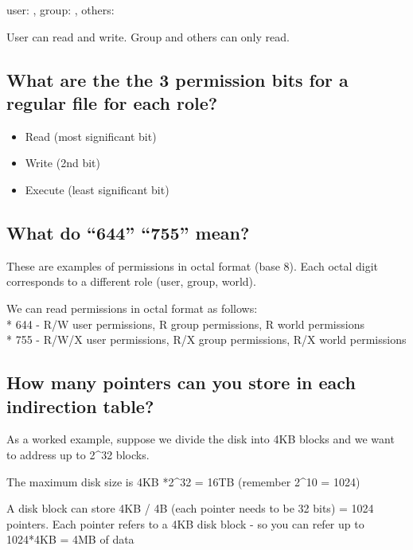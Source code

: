 user: , group: , others: 

User can read and write. Group and others can only read.

\subsection{What are the the 3 permission bits for a regular file for each role?}\label{what-are-the-the-3-permission-bits-for-a-regular-file-for-each-role}

\begin{itemize}
\tightlist
\item
  Read (most significant bit)\\
\item
  Write (2nd bit)\\
\item
  Execute (least significant bit)
\end{itemize}

\subsection{\texorpdfstring{What do ``644'' ``755'' mean?}{What do 644 755 mean?}}\label{what-do-644-755-mean}

These are examples of permissions in octal format (base 8). Each octal digit corresponds to a different role (user, group, world).

We can read permissions in octal format as follows:\\
* 644 - R/W user permissions, R group permissions, R world permissions\\
* 755 - R/W/X user permissions, R/X group permissions, R/X world permissions

\subsection{How many pointers can you store in each indirection table?}\label{how-many-pointers-can-you-store-in-each-indirection-table}

As a worked example, suppose we divide the disk into 4KB blocks and we want to address up to 2\^{}32 blocks.

The maximum disk size is 4KB *2\^{}32 = 16TB (remember 2\^{}10 = 1024)

A disk block can store 4KB / 4B (each pointer needs to be 32 bits) = 1024 pointers. Each pointer refers to a 4KB disk block - so you can refer up to 1024*4KB = 4MB of data

